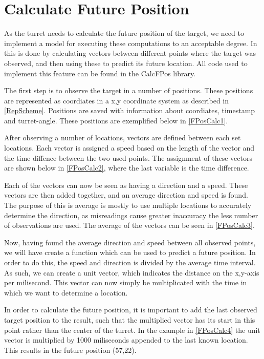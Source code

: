 \section{Calculate Future Position}
As the turret needs to calculate the future position of the target, we need to
implement a model for executing these computations to an acceptable degree. In
\name this is done by calculating vectors between different points where the
target was observed, and then using these to predict its future location. All
code used to implement this feature can be found in the CalcFPos library.\nl

The first step is to observe the target in a number of positions. These
positions are represented as coordiates in a x,y coordinate system as described
in \autoref{RepScheme}. Positions are saved with information about coordiates,
timestamp and turret-angle. These positions are exemplified below in
\autoref{FPosCalc1}.


After observing a number of locations, vectors are defined between each set
locations. Each vector is assigned a speed based on the length of the vector and
the time diffence between the two used points. The assignment of these vectors
are shown below in \autoref{FPosCalc2}, where the last variable is the time
difference.


Each of the vectors can now be seen as having a direction and a speed. These
vectors are then added together, and an average direction and speed is found.
The purpose of this is average is mostly to use multiple locations to accurately
determine the direction, as misreadings cause greater inaccuracy the less number
of observations are used. The average of the vectors can be seen in
\autoref{FPosCalc3}.


Now, having found the average direction and speed between all observed points,
we will have create a function which can be used to predict a future position.
In order to do this, the speed and direction is divided by the average time
interval. As such, we can create a unit vector, which indicates the distance on
the x,y-axis per milisecond. This vector can now simply be multiplicated with
the time in which we want to determine a location. 


In order to calculate the future position, it is important to add the last
observed target position to the result, such that the multiplied vector has its
start in this point rather than the center of the turret. In the example in
\autoref{FPosCalc4} the unit vector is multiplied by 1000 miliseconds appended
to the last known location. This results in the future position (57,22).




